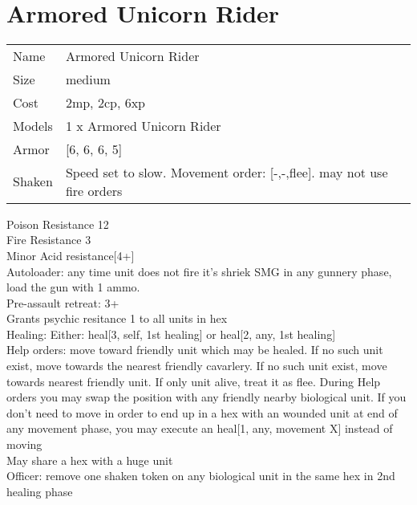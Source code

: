  
\ \\













\clearpage

\section{ Armored Unicorn Rider }

\begin{tabular}{ll}
  Name & Armored Unicorn Rider \\
  Size & medium\\
  Cost & 2mp, 2cp, 6xp\\
  Models & 1 x Armored Unicorn Rider\\
  Armor & [6, 6, 6, 5]\\
  Shaken & Speed set to slow. Movement order: [-,-,flee]. may not use fire orders\\
\end{tabular}

\noindent Poison Resistance 12\\ 
Fire Resistance 3\\ 
Minor Acid resistance[4+]\\ 
Autoloader: any time unit does not fire it's shriek SMG in any gunnery phase, load the gun with 1 ammo.\\ 
Pre-assault retreat: 3+\\ 
Grants psychic resitance 1 to all units in hex\\ 
Healing: Either: heal[3, self, 1st healing] or heal[2, any, 1st healing]\\ 
Help orders: move toward friendly unit which may be healed. If no such unit exist, move towards the nearest friendly cavarlery. If no such unit exist, move towards nearest friendly unit. If only unit alive, treat it as flee. During Help orders you may swap the position with any friendly nearby biological unit. If you don't need to move in order to end up in a hex with an wounded unit at end of any movement phase, you may execute an heal[1, any, movement X] instead of moving\\ 
May share a hex with a huge unit\\ 
Officer: remove one shaken token on any biological unit in the same hex in 2nd healing  phase\\ 


